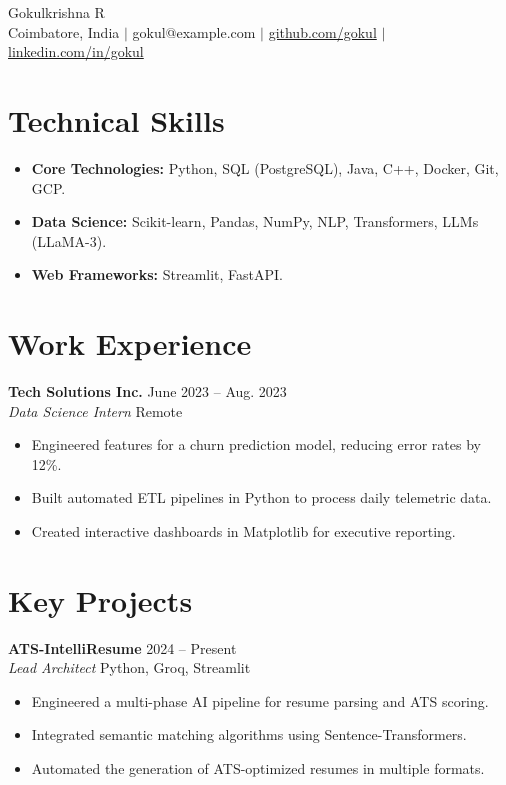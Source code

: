\documentclass[10pt,letterpaper]{article}
\newcommand{\entry}[4]{
  \vspace{-1pt}
  \textbf{#1} \hfill #2 \\
  \textit{#3} \hfill #4 \\
  \vspace{-5pt}
}
\begin{document}
\begin{center}
    {\Huge Gokulkrishna R} \\ \vspace{5pt}
    Coimbatore, India $|$ gokul@example.com $|$ \href{https://github.com/gokul}{github.com/gokul} $|$ \href{https://linkedin.com/in/gokul}{linkedin.com/in/gokul}
\end{center}

\section{Technical Skills}
\begin{itemize}[leftmargin=*, noitemsep]
    \item \textbf{Core Technologies:} Python, SQL (PostgreSQL), Java, C++, Docker, Git, GCP.
    \item \textbf{Data Science:} Scikit-learn, Pandas, NumPy, NLP, Transformers, LLMs (LLaMA-3).
    \item \textbf{Web Frameworks:} Streamlit, FastAPI.
\end{itemize}

\section{Work Experience}
\entry{Tech Solutions Inc.}{June 2023 -- Aug. 2023}{Data Science Intern}{Remote}
\begin{itemize}[noitemsep]
    \item Engineered features for a churn prediction model, reducing error rates by 12\%.
    \item Built automated ETL pipelines in Python to process daily telemetric data.
    \item Created interactive dashboards in Matplotlib for executive reporting.
\end{itemize}

\section{Key Projects}
\entry{ATS-IntelliResume}{2024 -- Present}{Lead Architect}{Python, Groq, Streamlit}
\begin{itemize}[noitemsep]
    \item Engineered a multi-phase AI pipeline for resume parsing and ATS scoring.
    \item Integrated semantic matching algorithms using Sentence-Transformers.
    \item Automated the generation of ATS-optimized resumes in multiple formats.
\end{itemize}
\end{document}
